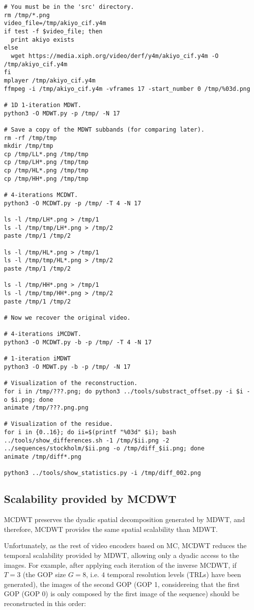 \begin{verbatim}
# You must be in the 'src' directory.
rm /tmp/*.png
video_file=/tmp/akiyo_cif.y4m
if test -f $video_file; then
  print akiyo exists
else
  wget https://media.xiph.org/video/derf/y4m/akiyo_cif.y4m -O /tmp/akiyo_cif.y4m
fi
mplayer /tmp/akiyo_cif.y4m
ffmpeg -i /tmp/akiyo_cif.y4m -vframes 17 -start_number 0 /tmp/%03d.png

# 1D 1-iteration MDWT.
python3 -O MDWT.py -p /tmp/ -N 17

# Save a copy of the MDWT subbands (for comparing later).
rm -rf /tmp/tmp
mkdir /tmp/tmp
cp /tmp/LL*.png /tmp/tmp
cp /tmp/LH*.png /tmp/tmp
cp /tmp/HL*.png /tmp/tmp
cp /tmp/HH*.png /tmp/tmp

# 4-iterations MCDWT.
python3 -O MCDWT.py -p /tmp/ -T 4 -N 17

ls -l /tmp/LH*.png > /tmp/1
ls -l /tmp/tmp/LH*.png > /tmp/2
paste /tmp/1 /tmp/2

ls -l /tmp/HL*.png > /tmp/1
ls -l /tmp/tmp/HL*.png > /tmp/2
paste /tmp/1 /tmp/2

ls -l /tmp/HH*.png > /tmp/1
ls -l /tmp/tmp/HH*.png > /tmp/2
paste /tmp/1 /tmp/2

# Now we recover the original video.

# 4-iterations iMCDWT.
python3 -O MCDWT.py -b -p /tmp/ -T 4 -N 17

# 1-iteration iMDWT
python3 -O MDWT.py -b -p /tmp/ -N 17

# Visualization of the reconstruction.
for i in /tmp/???.png; do python3 ../tools/substract_offset.py -i $i -o $i.png; done
animate /tmp/???.png.png

# Visualization of the residue.
for i in {0..16}; do ii=$(printf "%03d" $i); bash ../tools/show_differences.sh -1 /tmp/$ii.png -2 ../sequences/stockholm/$ii.png -o /tmp/diff_$ii.png; done
animate /tmp/diff*.png

python3 ../tools/show_statistics.py -i /tmp/diff_002.png
\end{verbatim}

\subsection{Scalability provided by MCDWT}
MCDWT preserves the dyadic spatial decomposition generated by MDWT,
and therefore, MCDWT provides the same spatial scalability than MDWT.

Unfortunately, as the rest of video encoders based on MC, MCDWT
reduces the temporal scalability provided by MDWT, allowing only a
dyadic access to the images. For example, after applying each
iteration of the inverse MCDWT, if $T=3$ (the GOP size $G=8$, i.e. $4$
temporal resolution levels (TRLs) have been generated), the images of
the second GOP (GOP 1, considereing that the first GOP (GOP 0) is only
composed by the first image of the sequence) should be reconstructed
in this order:

